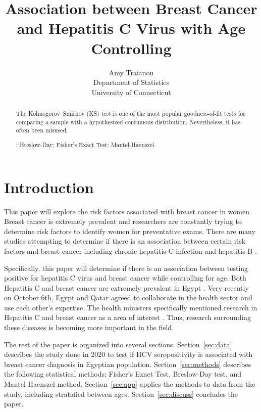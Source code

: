 \documentclass[12pt, titlepage]{article}
\title{Association between Breast Cancer and Hepatitis C Virus with Age Controlling}
\author{Amy Traianou\\
  Department of Statistics\\
  University of Connecticut
}
\begin{document}
\maketitle


\begin{abstract}
The Kolmogorov--Smirnov (KS) test is one of the most popular goodness-of-fit
tests for comparing a sample with a hypothesized continuous distribution.
Nevertheless, it has often been misused.


\bigskip
{}:
Breslow-Day;
Fisher's Exact Test;
Mantel-Haenszel.
\end{abstract}


\section{Introduction}
\label{sec:intro}

This paper will explore the risk factors associated with breast cancer in women. Breast cancer is extremely
prevalent and researchers are constantly trying to determine risk factors to identify women for preventative exams.
There are many studies attempting to determine if there is an association between certain risk factors and 
breast cancer including chronic hepatitis C infection \citep{Larrey2010is} and hepatitis B \citep{vishnu2016does}. 

Specifically, this paper will determine if there is an association between testing positive for hepatitis C virus
and breast cancer while controlling for age. Both Hepatitis C and breast cancer are extremely prevalent in 
Egypt \citep{Hussein2021high}. Very recently on October 6th, Egypt and Qatar agreed to collaborate in the 
health sector and use each 
other's expertise. The health ministers specifically mentioned research in Hepatitis C and breast cancer
as a area of interest \citep{arham2022egypt}. Thus, research surrounding these diseases is becoming more
important in the field. 

The rest of the paper is organized into several sections. Section~\ref{sec:data}
describes the study done in 2020 to test if HCV seropositivity is associated with 
breast cancer diagnosis in Egyptian population. Section~\ref{sec:methods} 
describes the following statistical methods; Fisher's Exact Test, Breslow-Day test,
and Mantel-Haenszel method.
Section~\ref{sec:app} applies the methods to data from the study, including
stratafied between ages.
Section~\ref{sec:discuss} concludes the paper.
\end{document}
